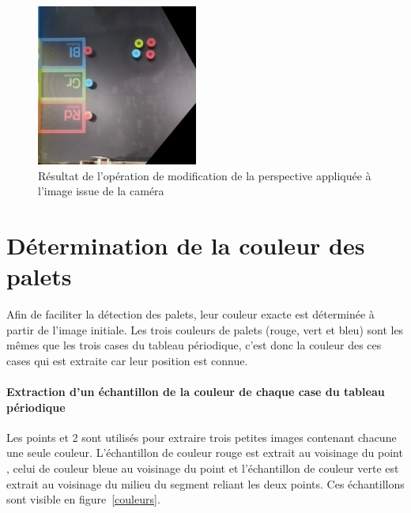 \documentclass{report}
\begin{document}
\begin{figure}[!h]
\begin{center}
\includegraphics[height=150pt]{apres_modif_perspective.jpg}
\end{center}
\caption{Résultat de l'opération de modification de la perspective appliquée à l'image issue de la caméra}
\label{perspective_corrigee}
\end{figure}

\section{Détermination de la couleur des palets}
Afin de faciliter la détection des palets, leur couleur exacte est déterminée à partir de l'image initiale.
Les trois couleurs de palets (rouge, vert et bleu) sont les mêmes que les trois cases du tableau périodique, c'est donc la couleur des ces cases
qui est extraite car leur position est connue.

\paragraph{Extraction d'un échantillon de la couleur de chaque case du tableau périodique}
Les points  et 2 sont utilisés pour extraire trois petites images contenant chacune une seule couleur.
L'échantillon de couleur rouge est extrait au voisinage du point , celui de couleur bleue au voisinage du point 
et l'échantillon de couleur verte est extrait au voisinage du milieu du segment reliant les deux points.
Ces échantillons sont visible en figure~\ref{couleurs}.
\end{document}
